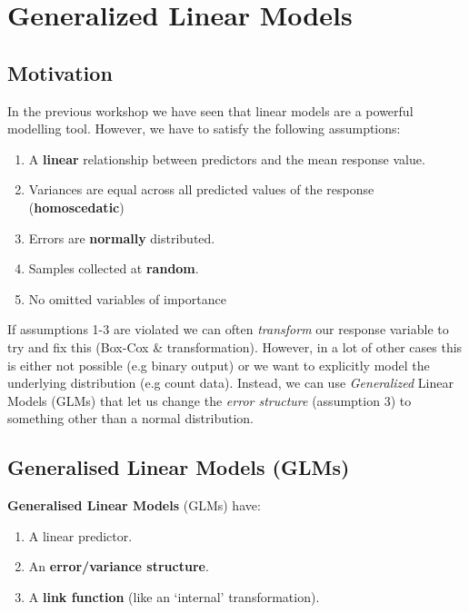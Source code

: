 \documentclass[
]{book}
\providecommand{\tightlist}{%
  \setlength{\itemsep}{0pt}\setlength{\parskip}{0pt}}
\begin{document}
\hypertarget{generalized-linear-models}{%
\chapter{Generalized Linear Models}\label{generalized-linear-models}}

\hypertarget{motivation}{%
\section{Motivation}\label{motivation}}

In the previous workshop we have seen that linear models are a powerful modelling tool.
However, we have to satisfy the following assumptions:

\begin{enumerate}
\def\labelenumi{\arabic{enumi}.}
\tightlist
\item
  A \textbf{linear} relationship between predictors and the mean response value.
\item
  Variances are equal across all predicted values of the response (\textbf{homoscedatic})
\item
  Errors are \textbf{normally} distributed.
\item
  Samples collected at \textbf{random}.
\item
  No omitted variables of importance
\end{enumerate}

If assumptions 1-3 are violated we can often \emph{transform} our response variable
to try and fix this (Box-Cox \& transformation).
However, in a lot of other cases this is either not possible (e.g binary output)
or we want to explicitly model the underlying distribution (e.g count data).
Instead, we can use \emph{Generalized} Linear Models (GLMs) that let us change the \emph{error structure} (assumption 3) to something other than a normal distribution.

\hypertarget{generalised-linear-models-glms}{%
\section{Generalised Linear Models (GLMs)}\label{generalised-linear-models-glms}}

\textbf{Generalised Linear Models} (GLMs) have:

\begin{enumerate}
\def\labelenumi{\arabic{enumi}.}
\tightlist
\item
  A linear predictor.
\item
  An \textbf{error/variance structure}.
\item
  A \textbf{link function} (like an `internal' transformation).
\end{enumerate}
\end{document}
